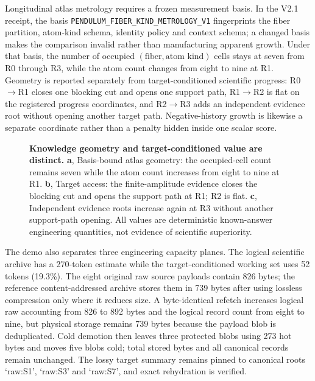 Longitudinal atlas metrology requires a frozen measurement basis. In the V2.1 receipt, the basis \texttt{PENDULUM\_FIBER\_KIND\_METROLOGY\_V1} fingerprints the fiber partition, atom-kind schema, identity policy and context schema; a changed basis makes the comparison invalid rather than manufacturing apparent growth. Under that basis, the number of occupied $(\text{fiber},\text{atom kind})$ cells stays at seven from R0 through R3, while the atom count changes from eight to nine at R1. Geometry is reported separately from target-conditioned scientific progress: R0$\rightarrow$R1 closes one blocking cut and opens one support path, R1$\rightarrow$R2 is flat on the registered progress coordinates, and R2$\rightarrow$R3 adds an independent evidence root without opening another target path. Negative-history growth is likewise a separate coordinate rather than a penalty hidden inside one scalar score.

\begin{figure}[t]
\centering

\caption{\textbf{Knowledge geometry and target-conditioned value are distinct.} \textbf{a}, Basis-bound atlas geometry: the occupied-cell count remains seven while the atom count increases from eight to nine at R1. \textbf{b}, Target access: the finite-amplitude evidence closes the blocking cut and opens the support path at R1; R2 is flat. \textbf{c}, Independent evidence roots increase again at R3 without another support-path opening. All values are deterministic known-answer engineering quantities, not evidence of scientific superiority.}
\label{fig:demogrowth}
\end{figure}

The demo also separates three engineering capacity planes. The logical scientific archive has a 270-token estimate while the target-conditioned working set uses 52 tokens (19.3\%). The eight original raw source payloads contain 826 bytes; the reference content-addressed archive stores them in 739 bytes after using lossless compression only where it reduces size. A byte-identical refetch increases logical raw accounting from 826 to 892 bytes and the logical record count from eight to nine, but physical storage remains 739 bytes because the payload blob is deduplicated. Cold demotion then leaves three protected blobs using 273 hot bytes and moves five blobs cold; total stored bytes and all canonical records remain unchanged. The lossy target summary remains pinned to canonical roots `raw:S1', `raw:S3' and `raw:S7', and exact rehydration is verified.

